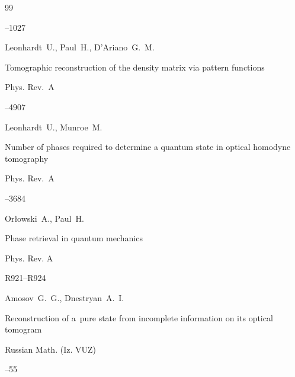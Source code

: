 \begin{thebibliography}{99}

--1027







\by Leonhardt~U.,  Paul~H., D'Ariano~G.~M.

\paper Tomographic reconstruction of the density matrix via pattern functions

 \jour Phys. Rev.~A




--4907





\by  Leonhardt~U., Munroe~M.

\paper Number of phases required to determine a quantum state in optical homodyne tomography

 \jour  Phys. Rev.~A




--3684







\by Or{\l}owski~A.,  Paul~H.

\paper Phase retrieval in quantum mechanics

\jour Phys. Rev. A




\pages R921--R924











\by Amosov~G.~G., Dnestryan~A.~I.

\paper Reconstruction of a~pure state from incomplete information on its optical tomogram

\jour Russian Math. (Iz. VUZ)




--55





\end{thebibliography}



